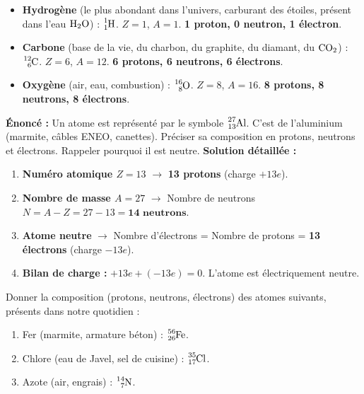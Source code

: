 \documentclass[11pt]{article}
\begin{document}
\begin{exemplebox}
\begin{itemize}
    \item \textbf{Hydrogène} (le plus abondant dans l'univers, carburant des étoiles, présent dans l'eau $\ce{H2O}$) : $\ce{^{1}_{1}H}$. $Z=1$, $A=1$. \textbf{1 proton, 0 neutron, 1 électron}.
    \item \textbf{Carbone} (base de la vie, du charbon, du graphite, du diamant, du $\ce{CO2}$) : $\ce{^{12}_{6}C}$. $Z=6$, $A=12$. \textbf{6 protons, 6 neutrons, 6 électrons}.
    \item \textbf{Oxygène} (air, eau, combustion) : $\ce{^{16}_{8}O}$. $Z=8$, $A=16$. \textbf{8 protons, 8 neutrons, 8 électrons}.
\end{itemize}
\end{exemplebox}

\begin{exoresolu}
\textbf{Énoncé :} Un atome est représenté par le symbole $\ce{^{27}_{13}Al}$. C'est de l'aluminium (marmite, câbles ENEO, canettes). Préciser sa composition en protons, neutrons et électrons. Rappeler pourquoi il est neutre.
\textbf{Solution détaillée :}
\begin{enumerate}
    \item \textbf{Numéro atomique $Z = 13$} $\rightarrow$ \textbf{13 protons} (charge $+13e$).
    \item \textbf{Nombre de masse $A = 27$} $\rightarrow$ Nombre de neutrons $N = A - Z = 27 - 13 = \textbf{14 neutrons}$.
    \item \textbf{Atome neutre} $\rightarrow$ Nombre d'électrons = Nombre de protons = \textbf{13 électrons} (charge $-13e$).
    \item \textbf{Bilan de charge :} $+13e + (-13e) = 0$. L'atome est électriquement neutre.
\end{enumerate}
\end{exoresolu}

\begin{exercice}
Donner la composition (protons, neutrons, électrons) des atomes suivants, présents dans notre quotidien :
\begin{enumerate}
    \item Fer (marmite, armature béton) : $\ce{^{56}_{26}Fe}$.
    \item Chlore (eau de Javel, sel de cuisine) : $\ce{^{35}_{17}Cl}$.
    \item Azote (air, engrais) : $\ce{^{14}_{7}N}$.
\end{enumerate}
\end{exercice}
\end{document}
